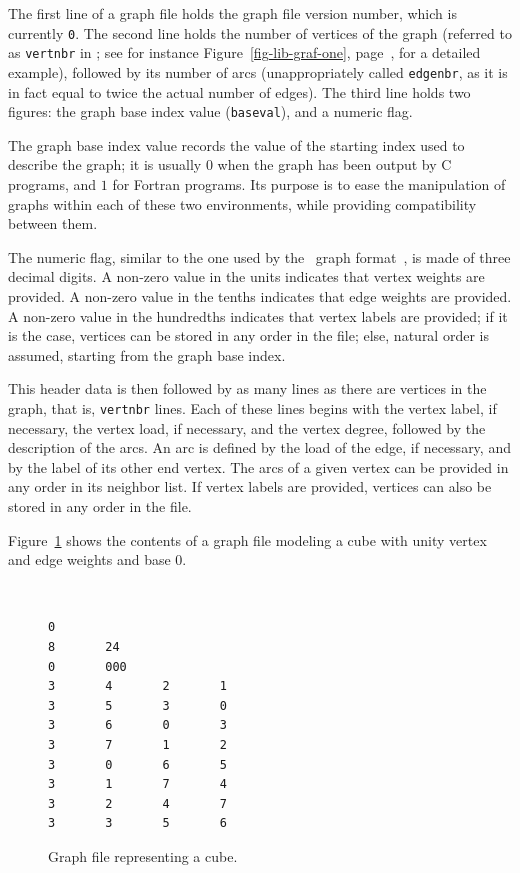 The first line of a graph file holds the graph file version number,
which is currently \texttt{0}. The second line holds the number of
vertices of the graph (referred to as \texttt{vertnbr} in \libscotch; see
for instance Figure~\ref{fig-lib-graf-one},
page~\pageref{fig-lib-graf-one}, for a detailed example), followed by
its number of arcs (unappropriately called \texttt{edgenbr}, as it is in
fact equal to twice the actual number of edges). The third line holds
two figures: the graph base index value (\texttt{baseval}), and a numeric
flag.

The graph base index value records the value of the starting index
used to describe the graph; it is usually $0$ when the graph has been
output by C programs, and $1$ for Fortran programs. Its purpose is to
ease the manipulation of graphs within each of these two environments,
while providing compatibility between them.

The numeric flag, similar to the one used by the \chaco\ graph
format~\cite{hele93c}, is made of three decimal digits.
A non-zero value in the units indicates that vertex weights are provided.
A non-zero value in the tenths indicates that edge weights are provided.
A non-zero value in the hundredths indicates that vertex labels are provided;
if it is the case, vertices can be stored in any order in the file; else,
natural order is assumed, starting from the graph base index.

This header data is then followed by as many lines as there are
vertices in the graph, that is, \texttt{vertnbr} lines. Each of these
lines begins with the vertex label, if necessary, the vertex load, if
necessary, and the vertex degree, followed by the description of the
arcs. An arc is defined by the load of the edge, if necessary, and by
the label of its other end vertex.
The arcs of a given vertex can be provided in any order in its
neighbor list. If vertex labels are provided, vertices can also be
stored in any order in the file.

Figure~\ref{fig-file-sgraph} shows the contents of a graph file
modeling a cube with unity vertex and edge weights and base $0$.

\begin{figure}[hbt]
\begin{center}
\begin{minipage}{7.3cm}
{\renewcommand{\baselinestretch}{1.05}
 \footnotesize \tt
\begin{verbatim}
0
8       24
0       000
3       4       2       1
3       5       3       0
3       6       0       3
3       7       1       2
3       0       6       5
3       1       7       4
3       2       4       7
3       3       5       6
\end{verbatim}}
\end{minipage}
\end{center}
\caption{Graph file representing a cube.}
\label{fig-file-sgraph}
\end{figure}

